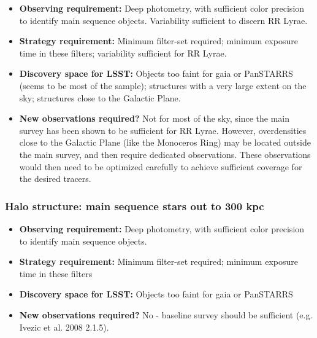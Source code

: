 \begin{itemize}
\item {\bf Observing requirement:} Deep photometry, with sufficient color precision to identify main sequence objects. Variability sufficient to discern RR Lyrae.
\vspace{-2mm}

\item {\bf Strategy requirement:} Minimum filter-set required; minimum exposure time in these filters; variability sufficient for RR Lyrae. 
\vspace{-2mm}

\item {\bf Discovery space for LSST:} Objects too faint for gaia or PanSTARRS (seems to be most of the sample); structures with a very large extent on the sky; structures close to the Galactic Plane.
\vspace{-2mm}

\item {\bf New observations required?} Not for most of the sky, since the main survey has been shown to be sufficient for RR Lyrae. However, overdensities close to the Galactic Plane (like the Monoceros Ring) may be located outside the main survey, and then require dedicated observations. These observations would then need to be optimized carefully to achieve sufficient coverage for the desired tracers.
\vspace{-2mm}
\end{itemize}

\subsubsection{Halo structure: main sequence stars out to 300 kpc}

\begin{itemize}
\item {\bf Observing requirement:} Deep photometry, with sufficient color precision to identify main sequence objects.  
\vspace{-2mm}

\item {\bf Strategy requirement:} Minimum filter-set required; minimum exposure time in these filters
\vspace{-2mm}

\item {\bf Discovery space for LSST:} Objects too faint for gaia or PanSTARRS
\vspace{-2mm}

\item {\bf New observations required?} No - baseline survey should be sufficient (e.g. Ivezic et al. 2008 2.1.5).
\vspace{-2mm}
\end{itemize}

